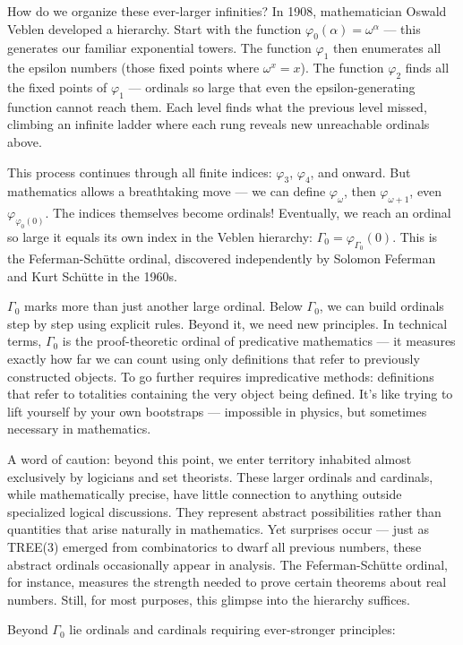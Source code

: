 How do we organize these ever-larger infinities? In 1908, mathematician Oswald Veblen developed a hierarchy. Start with the function $\varphi_0(\alpha) = \omega^\alpha$ — this generates our familiar exponential towers. The function $\varphi_1$ then enumerates all the epsilon numbers (those fixed points where $\omega^x = x$). The function $\varphi_2$ finds all the fixed points of $\varphi_1$ — ordinals so large that even the epsilon-generating function cannot reach them. Each level finds what the previous level missed, climbing an infinite ladder where each rung reveals new unreachable ordinals above.

This process continues through all finite indices: $\varphi_3$, $\varphi_4$, and onward. But mathematics allows a breathtaking move — we can define $\varphi_\omega$, then $\varphi_{\omega+1}$, even $\varphi_{\varphi_0(0)}$. The indices themselves become ordinals! Eventually, we reach an ordinal so large it equals its own index in the Veblen hierarchy: $\Gamma_0 = \varphi_{\Gamma_0}(0)$. This is the Feferman-Schütte ordinal, discovered independently by Solomon Feferman and Kurt Schütte in the 1960s.

$\Gamma_0$ marks more than just another large ordinal. Below $\Gamma_0$, we can build ordinals step by step using explicit rules. Beyond it, we need new principles. In technical terms, $\Gamma_0$ is the proof-theoretic ordinal of predicative mathematics — it measures exactly how far we can count using only definitions that refer to previously constructed objects. To go further requires impredicative methods: definitions that refer to totalities containing the very object being defined. It's like trying to lift yourself by your own bootstraps — impossible in physics, but sometimes necessary in mathematics.

A word of caution: beyond this point, we enter territory inhabited almost exclusively by logicians and set theorists. These larger ordinals and cardinals, while mathematically precise, have little connection to anything outside specialized logical discussions. They represent abstract possibilities rather than quantities that arise naturally in mathematics. Yet surprises occur — just as TREE(3) emerged from combinatorics to dwarf all previous numbers, these abstract ordinals occasionally appear in analysis. The Feferman-Schütte ordinal, for instance, measures the strength needed to prove certain theorems about real numbers. Still, for most purposes, this glimpse into the hierarchy suffices.

Beyond $\Gamma_0$ lie ordinals and cardinals requiring ever-stronger principles:

